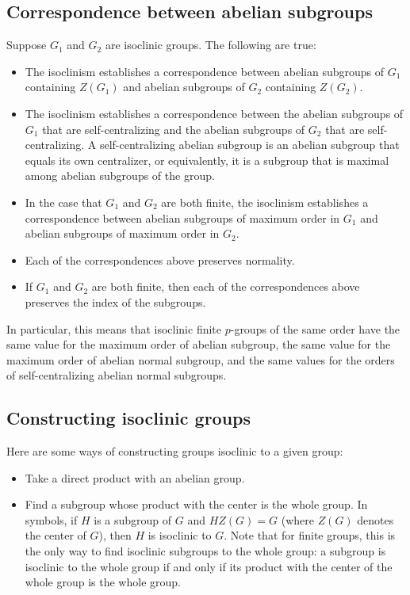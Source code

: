 \documentclass{ucetd}
\begin{document}
\subsection{Correspondence between abelian subgroups}\label{sec:isoclinism-abelian-subgroups}

Suppose $G_1$ and $G_2$ are isoclinic groups. The following are true:

\begin{itemize}
\item The isoclinism establishes a correspondence between abelian
  subgroups of $G_1$ containing $Z(G_1)$ and abelian subgroups of
  $G_2$ containing $Z(G_2)$.
\item The isoclinism establishes a correspondence between the abelian
  subgroups of $G_1$ that are self-centralizing and the abelian
  subgroups of $G_2$ that are self-centralizing. A self-centralizing
  abelian subgroup is an abelian subgroup that equals its own
  centralizer, or equivalently, it is a subgroup that is maximal among
  abelian subgroups of the group.
\item In the case that $G_1$ and $G_2$ are both finite, the isoclinism
  establishes a correspondence between abelian subgroups of maximum
  order in $G_1$ and abelian subgroups of maximum order in
  $G_2$.
\item Each of the correspondences above preserves normality.
\item If $G_1$ and $G_2$ are both finite, then each of the
  correspondences above preserves the index of the subgroups.
\end{itemize}

In particular, this means that isoclinic finite $p$-groups of the same
order have the same value for the maximum order of abelian subgroup,
the same value for the maximum order of abelian normal subgroup, and
the same values for the orders of self-centralizing abelian normal
subgroups.

\subsection{Constructing isoclinic groups}

Here are some ways of constructing groups isoclinic to a given group:

\begin{itemize}
\item Take a direct product with an abelian group.
\item Find a subgroup whose product with the center is the whole
  group. In symbols, if $H$ is a subgroup of $G$ and $HZ(G) = G$
  (where $Z(G)$ denotes the center of $G$), then $H$ is isoclinic to
  $G$. Note that for finite groups, this is the only way to find
  isoclinic subgroups to the whole group: a subgroup is isoclinic to
  the whole group if and only if its product with the center of the
  whole group is the whole group.
\end{itemize}
\end{document}
